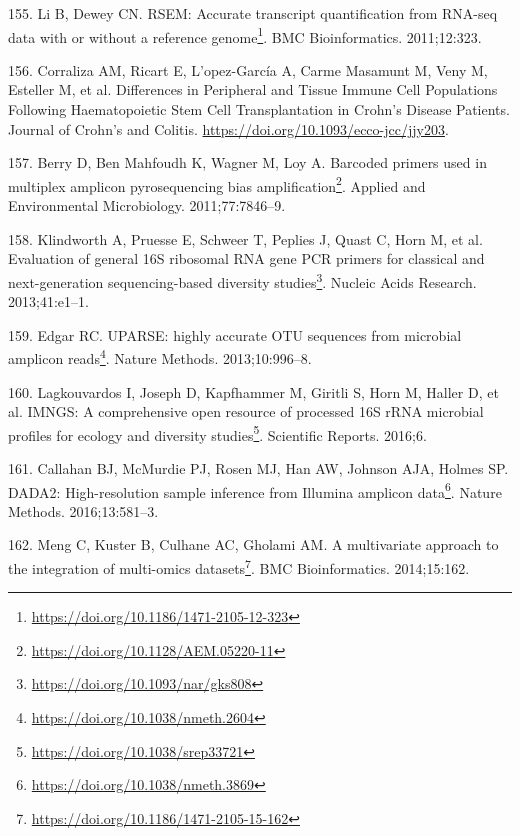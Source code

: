 \documentclass[
  a4paper,
]{book}
\DeclareRobustCommand{\href}[2]{#2\footnote{\url{#1}}}
\newlength{\cslhangindent}
\newlength{\cslentryspacingunit} %
\newenvironment{CSLReferences}[2] %
 {%
  \setlength{\parindent}{0pt}
  \ifodd #1
  \let\oldpar\par
  \def\par{\hangindent=\cslhangindent\oldpar}
  \fi
  \setlength{\parskip}{#2\cslentryspacingunit}
 }%
 {}
\begin{document}
\begin{CSLReferences}{0}{0}
\leavevmode{}%
155. Li B, Dewey CN. \href{https://doi.org/10.1186/1471-2105-12-323}{RSEM: Accurate transcript quantification from RNA-seq data with or without a reference genome}. BMC Bioinformatics. 2011;12:323.

\leavevmode{}%
156. Corraliza AM, Ricart E, L'opez-García A, Carme Masamunt M, Veny M, Esteller M, et al. Differences in {Peripheral} and {Tissue Immune Cell Populations Following Haematopoietic Stem Cell Transplantation} in {Crohn}'s {Disease Patients}. Journal of Crohn's and Colitis. \url{https://doi.org/10.1093/ecco-jcc/jjy203}.

\leavevmode{}%
157. Berry D, Ben Mahfoudh K, Wagner M, Loy A. \href{https://doi.org/10.1128/AEM.05220-11}{Barcoded primers used in multiplex amplicon pyrosequencing bias amplification}. Applied and Environmental Microbiology. 2011;77:7846--9.

\leavevmode{}%
158. Klindworth A, Pruesse E, Schweer T, Peplies J, Quast C, Horn M, et al. \href{https://doi.org/10.1093/nar/gks808}{Evaluation of general 16S ribosomal RNA gene PCR primers for classical and next-generation sequencing-based diversity studies}. Nucleic Acids Research. 2013;41:e1--1.

\leavevmode{}%
159. Edgar RC. \href{https://doi.org/10.1038/nmeth.2604}{UPARSE: highly accurate OTU sequences from microbial amplicon reads}. Nature Methods. 2013;10:996--8.

\leavevmode{}%
160. Lagkouvardos I, Joseph D, Kapfhammer M, Giritli S, Horn M, Haller D, et al. \href{https://doi.org/10.1038/srep33721}{IMNGS: A comprehensive open resource of processed 16S rRNA microbial profiles for ecology and diversity studies}. Scientific Reports. 2016;6.

\leavevmode{}%
161. Callahan BJ, McMurdie PJ, Rosen MJ, Han AW, Johnson AJA, Holmes SP. \href{https://doi.org/10.1038/nmeth.3869}{DADA2: High-resolution sample inference from Illumina amplicon data}. Nature Methods. 2016;13:581--3.

\leavevmode{}%
162. Meng C, Kuster B, Culhane AC, Gholami AM. \href{https://doi.org/10.1186/1471-2105-15-162}{A multivariate approach to the integration of multi-omics datasets}. BMC Bioinformatics. 2014;15:162.


\end{CSLReferences}
\end{document}
